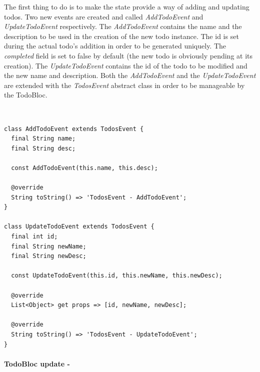 The first thing to do is to make the state provide a way of adding and updating todos. Two new events are created and called \textit{AddTodoEvent} and \textit{UpdateTodoEvent} respectively. The \textit{AddTodoEvent} contains the name and the description to be used in the creation of the new todo instance. The id is set during the actual todo’s addition in order to be generated uniquely. The \textit{completed} field is set to false by default (the new todo is obviously pending at its creation).  The \textit{UpdateTodoEvent} contains the id of the todo to be modified and the new name and description. Both the \textit{AddTodoEvent} and the \textit{UpdateTodoEvent} are extended with the \textit{TodosEvent} abstract class in order to be manageable by the TodoBloc.
\begin{code}
\mbox{}\\
 \mbox{}
\label{code:2.14}
\begin{verbatim}
class AddTodoEvent extends TodosEvent {
  final String name;
  final String desc;

  const AddTodoEvent(this.name, this.desc);

  @override
  String toString() => 'TodosEvent - AddTodoEvent';
}

class UpdateTodoEvent extends TodosEvent {
  final int id;
  final String newName;
  final String newDesc;

  const UpdateTodoEvent(this.id, this.newName, this.newDesc);

  @override
  List<Object> get props => [id, newName, newDesc];

  @override
  String toString() => 'TodosEvent - UpdateTodoEvent';
}
\end{verbatim}
\mbox{}
\end{code}
\paragraph{TodoBloc update - }
\label{subpar:todo_app_bloc_core_state}


